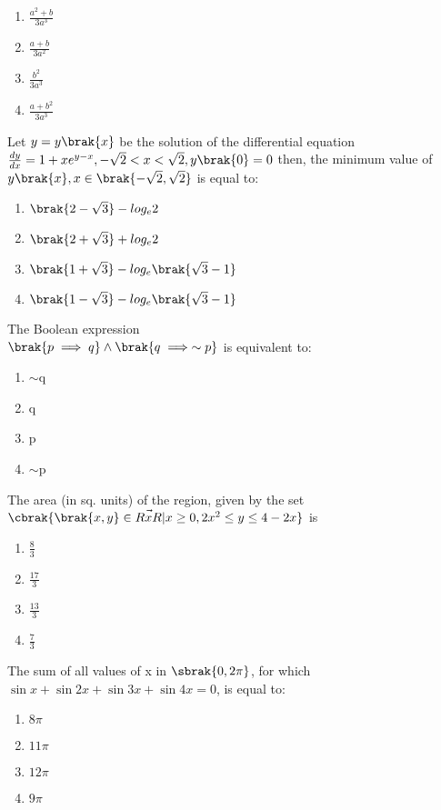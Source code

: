 \begin{enumerate}
    \item $\frac{a^2+b}{3a^3}$
    \item $\frac{a+b}{3a^2}$
    \item $\frac{b^2}{3a^3}$
    \item $\frac{a+b^2}{3a^3}$
\end{enumerate}
\item Let $y=y\brak{x}$ be the solution of the differential equation $\frac{dy}{dx}=1+xe^{y-x}, -\sqrt{2}<x<\sqrt{2},y\brak{0}=0$ then, the minimum value of $y\brak{x}, x \in \brak{-\sqrt{2}, \sqrt{2}}$ is equal to: \hfill{}
\begin{enumerate}
    \item $\brak{2-\sqrt{3}}-log_e2$
    \item $\brak{2+\sqrt{3}}+log_e2$
    \item $\brak{1+\sqrt{3}}-log_e\brak{\sqrt{3}-1}$
    \item $\brak{1-\sqrt{3}}-log_e\brak{\sqrt{3}-1}$
\end{enumerate}
\item The Boolean expression\\
$\brak{p \implies q} \land \brak{q \implies \sim p} $ is equivalent to: \hfill{}
\begin{enumerate}
    \item $\sim$q
    \item q
    \item p
    \item $\sim$p
\end{enumerate}
\item The area (in sq. units) of the region, given by the set $\cbrak{\brak{x,y} \in \vec{RxR}|x\geq0,2x^2\leq y\leq 4-2x}$ is \hfill{}
\begin{enumerate}
    \item $\frac{8}{3}$
    \item $\frac{17}{3}$
    \item $\frac{13}{3}$
    \item $\frac{7}{3}$
\end{enumerate}
\item The sum of all values of x in $\sbrak{0,2\pi}$, for which $\sin x+\sin2x+\sin3x+\sin4x=0$, is equal to: \hfill{}
\begin{enumerate}
    \item $8\pi$
    \item $11\pi$
    \item $12\pi$
    \item $9\pi$
\end{enumerate}
